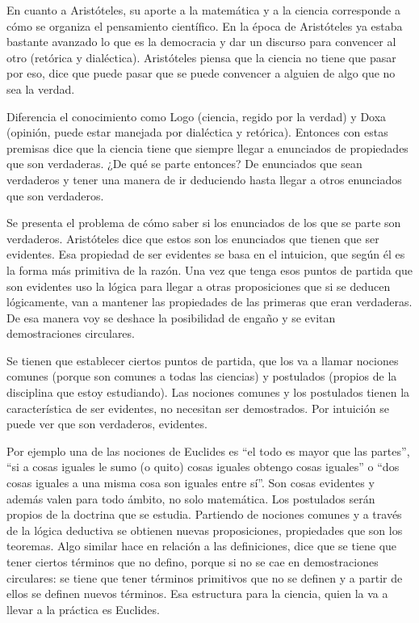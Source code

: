 En cuanto a Aristóteles, su aporte a la matemática y a la ciencia corresponde a cómo se organiza el pensamiento científico. En la época de Aristóteles ya estaba bastante avanzado lo que es la democracia y dar un discurso para convencer al otro (retórica y dialéctica). Aristóteles piensa que la ciencia no tiene que pasar por eso, dice que puede pasar que se puede convencer a alguien de algo que no sea la verdad. 

Diferencia el conocimiento como Logo (ciencia, regido por la verdad) y Doxa (opinión, puede estar manejada por dialéctica y retórica). Entonces con estas premisas dice que la ciencia tiene que siempre llegar a enunciados de propiedades que son verdaderas. ¿De qué se parte entonces? De enunciados que sean verdaderos y tener una manera de ir deduciendo hasta llegar a otros enunciados que son verdaderos. 

Se presenta el problema de cómo saber si los enunciados de los que se parte son verdaderos. Aristóteles dice que estos son los enunciados que tienen que ser evidentes. Esa propiedad de ser evidentes se basa en el intuicion, que según él es la forma más primitiva de la razón. Una vez que tenga esos puntos de partida que son evidentes uso la lógica para llegar a otras proposiciones que si se deducen lógicamente, van a mantener las propiedades de las primeras que eran verdaderas. De esa manera voy se deshace la posibilidad de engaño y se evitan demostraciones circulares. 

Se tienen que establecer ciertos puntos de partida, que los va a llamar nociones comunes (porque son comunes a todas las ciencias) y postulados (propios de la disciplina que estoy estudiando). Las nociones comunes y los postulados tienen la característica de ser evidentes, no necesitan ser demostrados. Por intuición se puede ver que son verdaderos, evidentes. 

Por ejemplo una de las nociones de Euclides es “el todo es mayor que las partes”, “si a cosas iguales le sumo (o quito) cosas iguales obtengo cosas iguales” o “dos cosas iguales a una misma cosa son iguales entre sí”. Son cosas evidentes y además valen para todo ámbito, no solo matemática. Los postulados serán propios de la doctrina que se estudia. Partiendo de nociones comunes y a través de la lógica deductiva se obtienen nuevas proposiciones, propiedades que son los teoremas. Algo similar hace en relación a las definiciones, dice que se tiene que tener ciertos términos que no defino, porque si no se cae en demostraciones circulares: se tiene que tener términos primitivos que no se definen y a partir de ellos se definen nuevos términos. Esa estructura para la ciencia, quien la va a llevar a la práctica es Euclides. 
